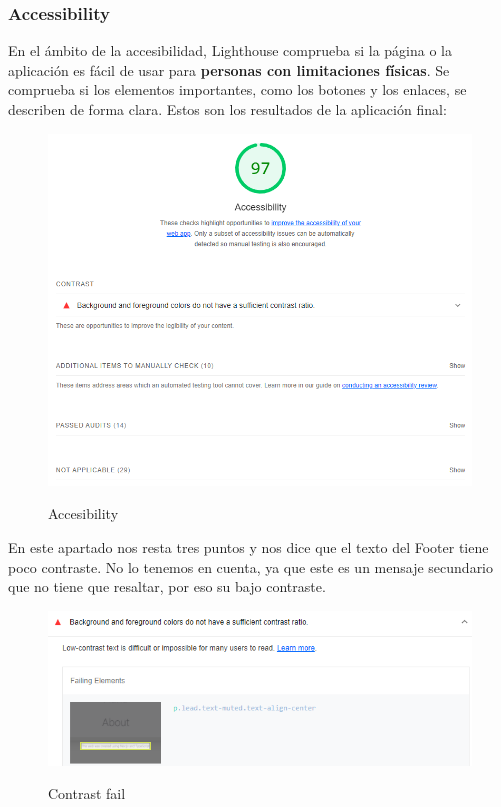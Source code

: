 \documentclass[12pt,twoside,titlepage]{report}
\begin{document}
\subsubsection{Accessibility}

En el ámbito de la accesibilidad, Lighthouse comprueba si la página o la aplicación es fácil de usar para \textbf{personas con limitaciones físicas}. Se comprueba si los elementos importantes, como los botones y los enlaces, se describen de forma clara. Estos son los resultados de la aplicación final:

\begin{figure}[H]
    \centering
    \includegraphics[scale=0.6]{Lighthouse/Accesibility}
    \label{fig:Lighthouse_accesibility}
    \caption{Accesibility}
\end{figure}

En este apartado nos resta tres puntos y nos dice que el texto del Footer tiene poco contraste. No lo tenemos en cuenta, ya que este es un mensaje secundario que no tiene que resaltar, por eso su bajo contraste.

\begin{figure}[H]
    \centering
    \includegraphics[scale=0.6]{Lighthouse/AccesibilityContrast}
    \label{fig:Lighthouse_contrast}
    \caption{Contrast fail}
\end{figure}
\end{document}
